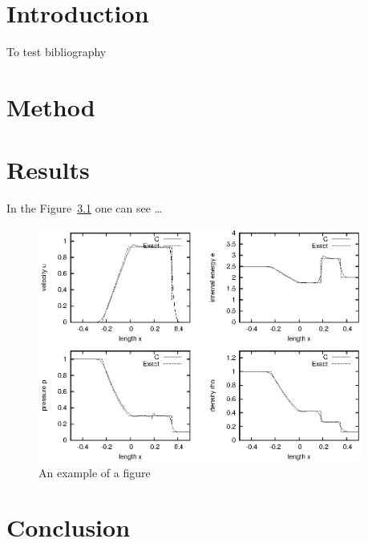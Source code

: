 \documentclass{report}
\begin{document}


\tableofcontents
\chapter{Introduction}
\label{sec:intro}
To test bibliography~\cite{Monaghan2005}

\chapter{Method}
\label{sec:method}





\chapter{Results}
\label{sec:results}

In the Figure~\ref{fig:1dshock} one can see \ldots

\begin{figure}[h]
  \centering
  \includegraphics[width=0.95\textwidth]{img/1dshock.eps}
  \caption{An example of a figure}
  \label{fig:1dshock}
\end{figure}




\chapter{Conclusion}
\label{sec:conclusion}

\listoffigures



\end{document}
